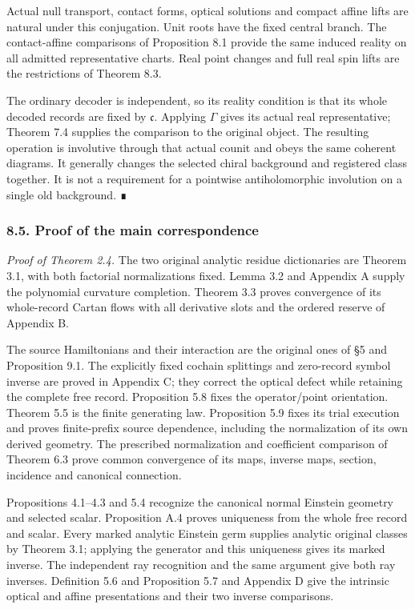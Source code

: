 \documentclass[
  english,
  11pt,
  reqno]{amsart}
\begin{document}
Actual null transport, contact forms, optical solutions and compact
affine lifts are natural under this conjugation. Unit roots have the
fixed central branch. The contact-affine comparisons of Proposition 8.1
provide the same induced reality on all admitted representative charts.
Real point changes and full real spin lifts are the restrictions of
Theorem 8.3.

The ordinary decoder is independent, so its reality condition is that
its whole decoded records are fixed by \(\mathfrak c\). Applying
\(\Gamma\) gives its actual real representative; Theorem 7.4 supplies
the comparison to the original object. The resulting operation is
involutive through that actual counit and obeys the same coherent
diagrams. It generally changes the selected chiral background and
registered class together. It is not a requirement for a pointwise
antiholomorphic involution on a single old background. ∎

\protect{}\label{sec:gg-main-proof}

\subsubsection{8.5. Proof of the main
correspondence}\label{proof-of-the-main-correspondence}

\emph{Proof of Theorem 2.4.} The two original analytic residue
dictionaries are Theorem 3.1, with both factorial normalizations fixed.
Lemma 3.2 and Appendix A supply the polynomial curvature completion.
Theorem 3.3 proves convergence of its whole-record Cartan flows with all
derivative slots and the ordered reserve of Appendix B.

The source Hamiltonians and their interaction are the original ones of
§5 and Proposition 9.1. The explicitly fixed cochain splittings and
zero-record symbol inverse are proved in Appendix C; they correct the
optical defect while retaining the complete free record. Proposition 5.8
fixes the operator/point orientation. Theorem 5.5 is the finite
generating law. Proposition 5.9 fixes its trial execution and proves
finite-prefix source dependence, including the normalization of its own
derived geometry. The prescribed normalization and coefficient
comparison of Theorem 6.3 prove common convergence of its maps, inverse
maps, section, incidence and canonical connection.

Propositions 4.1--4.3 and 5.4 recognize the canonical normal Einstein
geometry and selected scalar. Proposition A.4 proves uniqueness from the
whole free record and scalar. Every marked analytic Einstein germ
supplies analytic original classes by Theorem 3.1; applying the
generator and this uniqueness gives its marked inverse. The independent
ray recognition and the same argument give both ray inverses. Definition
5.6 and Proposition 5.7 and Appendix D give the intrinsic optical and
affine presentations and their two inverse comparisons.
\end{document}
